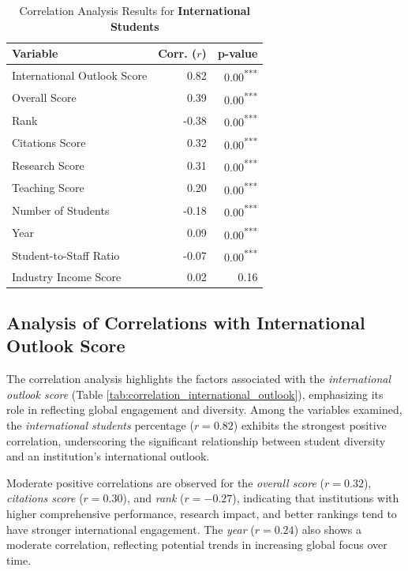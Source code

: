 \documentclass[conference]{IEEEtran}
\begin{document}
\begin{table}[h!]
	\centering
	\caption{Correlation Analysis Results for \textbf{International Students}}
	\label{tab:correlation_intl_students}
	\begin{tabular}{|l|r|r|}
		\hline
		\textbf{Variable} & \textbf{Corr. ($r$)} & \textbf{p-value} \\
		\hline
		International Outlook Score & 0.82 & 0.00\textsuperscript{***} \\
		Overall Score & 0.39 & 0.00\textsuperscript{***} \\
		Rank & -0.38 & 0.00\textsuperscript{***} \\
		Citations Score & 0.32 & 0.00\textsuperscript{***} \\
		Research Score & 0.31 & 0.00\textsuperscript{***} \\
		Teaching Score & 0.20 & 0.00\textsuperscript{***} \\
		Number of Students & -0.18 & 0.00\textsuperscript{***} \\
		Year & 0.09 & 0.00\textsuperscript{***} \\
		Student-to-Staff Ratio & -0.07 & 0.00\textsuperscript{***} \\
		Industry Income Score & 0.02 & 0.16 \\
		\hline
	\end{tabular}
\end{table}



\subsection{Analysis of Correlations with International Outlook Score}

The correlation analysis highlights the factors associated with the \textit{international outlook score} (Table \ref{tab:correlation_international_outlook}), emphasizing its role in reflecting global engagement and diversity. Among the variables examined, the \textit{international students} percentage ($r = 0.82$) exhibits the strongest positive correlation, underscoring the significant relationship between student diversity and an institution's international outlook.

Moderate positive correlations are observed for the \textit{overall score} ($r = 0.32$), \textit{citations score} ($r = 0.30$), and \textit{rank} ($r = -0.27$), indicating that institutions with higher comprehensive performance, research impact, and better rankings tend to have stronger international engagement. The \textit{year} ($r = 0.24$) also shows a moderate correlation, reflecting potential trends in increasing global focus over time.
\end{document}
